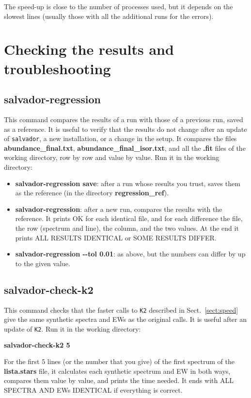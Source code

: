 \documentclass[modern]{aastex701}
\begin{document}
The speed-up is close to the number of processes used, but it depends on the slowest lines (usually those with all the additional runs for the errors).

\section{Checking the results and troubleshooting} \label{sect:tools}
\hrulefill

\subsection{salvador-regression}
This command compares the results of a run with those of a previous run, saved as a reference. It is useful to verify that the results do not change after an update of \texttt{salvador}, a new installation, or a change in the setup. It compares the files {\bf abundance\_final.txt}, {\bf abundance\_final\_isor.txt}, and all the {\bf .fit} files of the working directory, row by row and value by value. Run it in the working directory:
\begin{itemize}
    \item {\bf salvador-regression save}: after a run whose results you trust, saves them as the reference (in the directory {\bf regression\_ref}).
    \item {\bf salvador-regression}: after a new run, compares the results with the reference. It prints OK for each identical file, and for each difference the file, the row (spectrum and line), the column, and the two values. At the end it prints ALL RESULTS IDENTICAL or SOME RESULTS DIFFER.
    \item {\bf salvador-regression -{}-tol 0.01}: as above, but the numbers can differ by up to the given value.
\end{itemize}

\subsection{salvador-check-k2}
This command checks that the faster calls to \texttt{K2} described in Sect.~\ref{sect:speed} give the same synthetic spectra and EWs as the original calls. It is useful after an update of \texttt{K2}. Run it in the working directory: 
\begin{center}
    {\bf salvador-check-k2 5}
\end{center}
For the first 5 lines (or the number that you give) of the first spectrum of the {\bf lista.stars} file, it calculates each synthetic spectrum and EW in both ways, compares them value by value, and prints the time needed. It ends with ALL SPECTRA AND EWs IDENTICAL if everything is correct.
\end{document}
